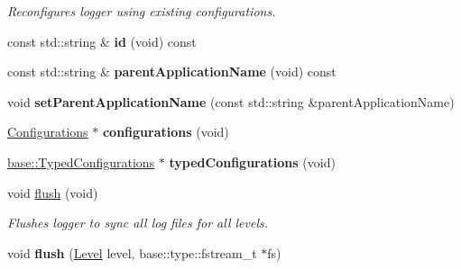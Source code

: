 \begin{DoxyCompactItemize}
\begin{DoxyCompactList}\small\item\em Reconfigures logger using existing configurations. \end{DoxyCompactList}\item 
\hypertarget{classel_1_1Logger_ae51a621df3c835f51f450134ba66f8ac}{const std\-::string \& {\bfseries id} (void) const }\label{classel_1_1Logger_ae51a621df3c835f51f450134ba66f8ac}

\item 
\hypertarget{classel_1_1Logger_a9e56e468bccd7b52281e7bbc75892431}{const std\-::string \& {\bfseries parent\-Application\-Name} (void) const }\label{classel_1_1Logger_a9e56e468bccd7b52281e7bbc75892431}

\item 
\hypertarget{classel_1_1Logger_a6890af8910adba26b01ef029429c4f15}{void {\bfseries set\-Parent\-Application\-Name} (const std\-::string \&parent\-Application\-Name)}\label{classel_1_1Logger_a6890af8910adba26b01ef029429c4f15}

\item 
\hypertarget{classel_1_1Logger_aeb57aeaddbb3dcd0cb96114019817142}{\hyperlink{classel_1_1Configurations}{Configurations} $\ast$ {\bfseries configurations} (void)}\label{classel_1_1Logger_aeb57aeaddbb3dcd0cb96114019817142}

\item 
\hypertarget{classel_1_1Logger_ac1d34e77892ea506b011d5279b6b139d}{\hyperlink{classel_1_1base_1_1TypedConfigurations}{base\-::\-Typed\-Configurations} $\ast$ {\bfseries typed\-Configurations} (void)}\label{classel_1_1Logger_ac1d34e77892ea506b011d5279b6b139d}

\item 
\hypertarget{classel_1_1Logger_a9a89d454008b1ee1a197eec4b92ce22a}{void \hyperlink{classel_1_1Logger_a9a89d454008b1ee1a197eec4b92ce22a}{flush} (void)}\label{classel_1_1Logger_a9a89d454008b1ee1a197eec4b92ce22a}

\begin{DoxyCompactList}\small\item\em Flushes logger to sync all log files for all levels. \end{DoxyCompactList}\item 
\hypertarget{classel_1_1Logger_a83c85278ebeeef6a24cc112e56c344dd}{void {\bfseries flush} (\hyperlink{namespaceel_ab0ac6091262344c52dd2d3ad099e8e36}{Level} level, base\-::type\-::fstream\-\_\-t $\ast$fs)}\label{classel_1_1Logger_a83c85278ebeeef6a24cc112e56c344dd}


\end{DoxyCompactItemize}
